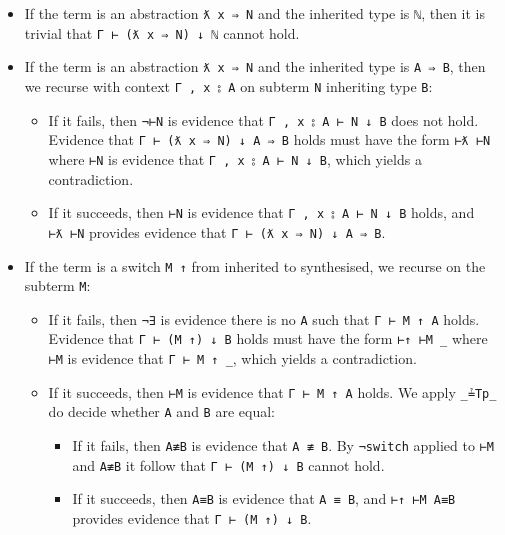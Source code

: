 \begin{itemize}
\item
  If the term is an abstraction \texttt{ƛ\ x\ ⇒\ N} and the inherited
  type is \texttt{\textasciigrave{}ℕ}, then it is trivial that
  \texttt{Γ\ ⊢\ (ƛ\ x\ ⇒\ N)\ ↓\ \textasciigrave{}ℕ} cannot hold.
\item
  If the term is an abstraction \texttt{ƛ\ x\ ⇒\ N} and the inherited
  type is \texttt{A\ ⇒\ B}, then we recurse with context
  \texttt{Γ\ ,\ x\ ⦂\ A} on subterm \texttt{N} inheriting type
  \texttt{B}:

  \begin{itemize}
  \item
    If it fails, then \texttt{¬⊢N} is evidence that
    \texttt{Γ\ ,\ x\ ⦂\ A\ ⊢\ N\ ↓\ B} does not hold. Evidence that
    \texttt{Γ\ ⊢\ (ƛ\ x\ ⇒\ N)\ ↓\ A\ ⇒\ B} holds must have the form
    \texttt{⊢ƛ\ ⊢N} where \texttt{⊢N} is evidence that
    \texttt{Γ\ ,\ x\ ⦂\ A\ ⊢\ N\ ↓\ B}, which yields a contradiction.
  \item
    If it succeeds, then \texttt{⊢N} is evidence that
    \texttt{Γ\ ,\ x\ ⦂\ A\ ⊢\ N\ ↓\ B} holds, and \texttt{⊢ƛ\ ⊢N}
    provides evidence that \texttt{Γ\ ⊢\ (ƛ\ x\ ⇒\ N)\ ↓\ A\ ⇒\ B}.
  \end{itemize}
\item
  If the term is a switch \texttt{M\ ↑} from inherited to synthesised,
  we recurse on the subterm \texttt{M}:

  \begin{itemize}
  \item
    If it fails, then \texttt{¬∃} is evidence there is no \texttt{A}
    such that \texttt{Γ\ ⊢\ M\ ↑\ A} holds. Evidence that
    \texttt{Γ\ ⊢\ (M\ ↑)\ ↓\ B} holds must have the form
    \texttt{⊢↑\ ⊢M\ \_} where \texttt{⊢M} is evidence that
    \texttt{Γ\ ⊢\ M\ ↑\ \_}, which yields a contradiction.
  \item
    If it succeeds, then \texttt{⊢M} is evidence that
    \texttt{Γ\ ⊢\ M\ ↑\ A} holds. We apply \texttt{\_≟Tp\_} do decide
    whether \texttt{A} and \texttt{B} are equal:

    \begin{itemize}
    \item
      If it fails, then \texttt{A≢B} is evidence that \texttt{A\ ≢\ B}.
      By \texttt{¬switch} applied to \texttt{⊢M} and \texttt{A≢B} it
      follow that \texttt{Γ\ ⊢\ (M\ ↑)\ ↓\ B} cannot hold.
    \item
      If it succeeds, then \texttt{A≡B} is evidence that
      \texttt{A\ ≡\ B}, and \texttt{⊢↑\ ⊢M\ A≡B} provides evidence that
      \texttt{Γ\ ⊢\ (M\ ↑)\ ↓\ B}.
    \end{itemize}
  \end{itemize}
\end{itemize}

